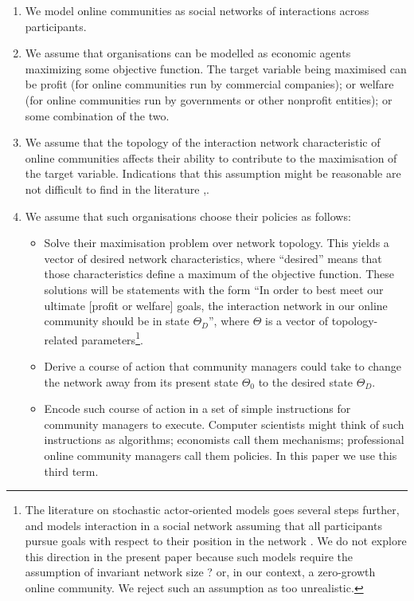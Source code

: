 \documentclass{article}
\begin{document}
\begin{enumerate}
\item We model online communities as social networks of interactions across participants. 
\item We assume that organisations can be modelled as economic agents maximizing some objective function. The target variable being maximised can be profit (for online communities run by commercial companies); or welfare (for online communities run by governments or other nonprofit entities); or some combination of the two. 
\item We assume that the topology of the interaction network characteristic of online communities affects their ability to contribute to the maximisation of the target variable. Indications that this assumption might be reasonable are not difficult to find in the literature \cite{tapscott2008wikinomics},\cite{slegg2014facebook}.
\item We assume that such organisations choose their policies as follows: 
    \begin{itemize} 
	\item Solve their maximisation problem over network topology. This yields a vector of desired network characteristics, where ``desired'' means that those characteristics define a maximum of the objective function. These solutions will be statements with the form ``In order to best meet our ultimate [profit or welfare] goals, the interaction network in our online community should be in state $\Theta_D$'', where $\Theta$ is a vector of topology-related parameters\footnote{The literature on stochastic actor-oriented models goes several steps further, and models interaction in a social network assuming that all participants pursue goals with respect to their position in the network \cite{snijders1996stochastic}. We do not explore this direction in the present paper because such models require the assumption of invariant network size ? or, in our context, a zero-growth online community. We reject such an assumption as too unrealistic.}.
	\item Derive a course of action that community managers could take to change the network away from its present state $\Theta_0$ to the desired state $\Theta_D$.
	\item Encode such course of action in a set of simple instructions for community managers to execute. Computer scientists might think of such instructions as algorithms; economists call them mechanisms; professional online community managers call them policies. In this paper we use this third term. 
    \end{itemize}
\end{enumerate}
\end{document}
